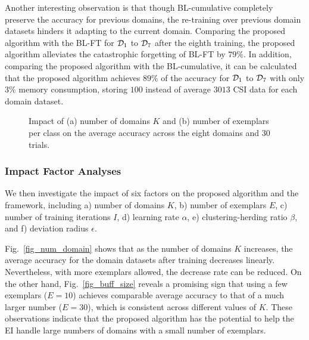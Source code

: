 Another interesting observation is that though BL-cumulative completely preserve the accuracy for previous domains, the re-training over previous domain datasets hinders it adapting to the current domain.
Comparing the proposed algorithm with the BL-FT for $\mathcal{D}_1$ to $\mathcal{D}_7$ after the eighth training, the proposed algorithm alleviates the catastrophic forgetting of BL-FT by $79\%$.
In addition, comparing the proposed algorithm with the BL-cumulative, it can be calculated that the proposed algorithm achieves $89\%$ of the accuracy for $\mathcal{D}_1$ to $\mathcal{D}_7$ with only $3\%$ memory consumption, storing $100$ instead of average $3013$ CSI data for each domain dataset.


\begin{figure}[t]
	\centering 
	\setlength{\abovecaptionskip}{6pt} 
	\setlength{\belowdisplayskip}{-5pt}
	\hspace{-10pt}
	\vspace{-.7ex}
	\caption{Impact of (a) number of domains $K$ and (b) number of exemplars per class on the average accuracy across the eight domains and 30 trials.}
	\vspace{-.8ex}
\end{figure} 
\subsubsection{Impact Factor Analyses}
We then investigate the impact of six factors on the proposed algorithm and the \name framework, including 
a) number of domains $K$,
b) number of exemplars $E$,
c) number of training iterations $I$, 
d) learning rate $\alpha$,
e) clustering-herding ratio $\beta$,
and f) deviation radius $\epsilon$.



Fig.~\ref{fig_num_domain} shows that as the number of domains $K$ increases, the average accuracy for the domain datasets after training decreases linearly.
Nevertheless, with more exemplars allowed, the decrease rate can be reduced.
On the other hand, Fig.~\ref{fig_buff_size} reveals a promising sign that using a few exemplars ($E=10$) achieves comparable average accuracy to that of a much larger number ($E=30$), which is consistent across different values of $K$.
These observations indicate that the proposed algorithm has the potential to help the EI handle large numbers of domains with a small number of exemplars.

